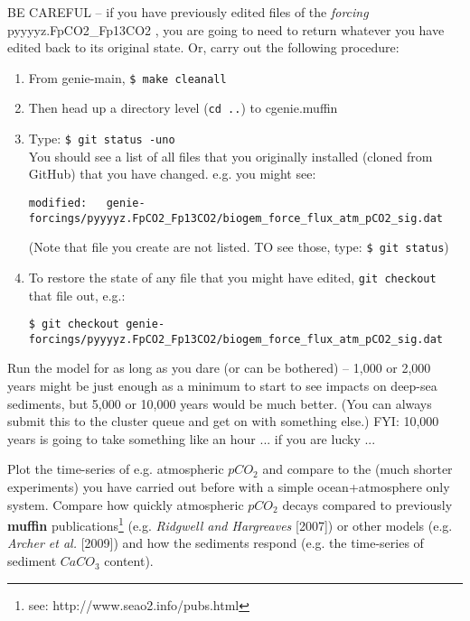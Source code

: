 \documentclass[11pt,fleqn]{book} %
\begin{document}
BE CAREFUL -- if you have previously edited files of the \textit{forcing} \textsf{\footnotesize  pyyyyz.FpCO2\_Fp13CO2 }, you are going to need to return whatever you have edited back to its original state. Or, carry out the following procedure:
\vspace{1mm}
\begin{enumerate}[noitemsep]
\item From \textsf{\footnotesize genie-main}, \texttt{\$ make cleanall}
\item Then head up a directory level (\texttt{cd ..}) to \textsf{\footnotesize cgenie.muffin}
\item Type: \texttt{\$ git status -uno}
\\You should see a list of all files that you originally installed (cloned from GitHub) that you have changed. e.g. you might see:
\vspace{-1mm}\small\begin{verbatim}
modified:   genie-forcings/pyyyyz.FpCO2_Fp13CO2/biogem_force_flux_atm_pCO2_sig.dat
\end{verbatim}\normalsize\vspace{-1mm}
(Note that file you create are not listed. TO see those, type: \texttt{\$ git status})
\item To restore the state of any file that you might have edited, \texttt{git checkout} that file out, e.g.:
\vspace{-1mm}\small\begin{verbatim}
$ git checkout genie-forcings/pyyyyz.FpCO2_Fp13CO2/biogem_force_flux_atm_pCO2_sig.dat
\end{verbatim}\normalsize\vspace{-1mm}
\end{enumerate}
\vspace{1mm}

Run the model for as long as you dare (or can be bothered) – 1,000 or 2,000 years might be just enough as a minimum to start to see impacts on deep-sea sediments, but 5,000 or 10,000 years would be much better. (You can always submit this to the cluster queue and get on with something else.) FYI: 10,000 years is going to take something like an hour ... if you are lucky ...

Plot the time-series of e.g. atmospheric \(pCO_{2}\) and compare to the (much shorter experiments) you have carried out before with a simple ocean+atmosphere only system. Compare how quickly atmospheric \(pCO_{2}\) decays compared to previously \textbf{muffin} publications\footnote{see: http://www.seao2.info/pubs.html} (e.g. \textit{Ridgwell and Hargreaves} [2007]) or other models (e.g. \textit{Archer et al.} [2009]) and  how the sediments respond (e.g. the time-series of sediment \(CaCO_{3}\) content).
\end{document}
